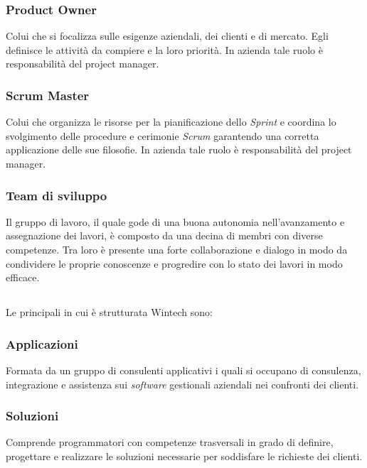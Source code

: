 \subsubsection*{Product Owner}
Colui che si focalizza sulle esigenze aziendali, dei clienti e di mercato. Egli definisce le attività da compiere e la loro priorità.
In azienda tale ruolo è responsabilità del \gls{project manager}. 

\subsubsection*{Scrum Master}
Colui che organizza le risorse per la pianificazione dello \emph{Sprint} e coordina lo svolgimento delle procedure e cerimonie \emph{Scrum} garantendo una corretta applicazione delle sue filosofie.
In azienda tale ruolo è responsabilità del \gls{project manager}. 

\subsubsection*{Team di sviluppo}
Il gruppo di lavoro, il quale gode di una buona autonomia nell'avanzamento e assegnazione dei lavori, è composto da una decina di membri con diverse competenze. Tra loro è presente una forte collaborazione e dialogo in modo da condividere le proprie conoscenze e progredire con lo stato dei lavori in modo efficace. 


\subsection{}
Le principali  in cui è strutturata Wintech sono:

\subsubsection*{Applicazioni}
Formata da un gruppo di consulenti applicativi i quali si occupano di consulenza, integrazione e assistenza sui \emph{software} gestionali aziendali nei confronti dei clienti. 

\subsubsection*{Soluzioni}
Comprende programmatori con competenze trasversali in grado di definire, progettare e realizzare le soluzioni necessarie per soddisfare le richieste dei clienti. 

